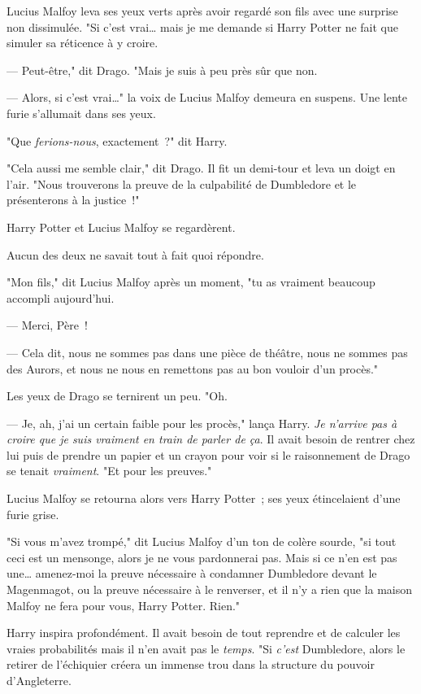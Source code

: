 Lucius Malfoy leva ses yeux verts après avoir regardé son fils avec une surprise non dissimulée. "Si c'est vrai… mais je me demande si Harry Potter ne fait que simuler sa réticence à y croire.

--- Peut-être," dit Drago. "Mais je suis à peu près sûr que non.

--- Alors, si c'est vrai…" la voix de Lucius Malfoy demeura en suspens. Une lente furie s'allumait dans ses yeux.

"Que \emph{ferions-nous}, exactement~?" dit Harry.

"Cela aussi me semble clair," dit Drago. Il fit un demi-tour et leva un doigt en l'air. "Nous trouverons la preuve de la culpabilité de Dumbledore et le présenterons à la justice~!"

Harry Potter et Lucius Malfoy se regardèrent.

Aucun des deux ne savait tout à fait quoi répondre.

"Mon fils," dit Lucius Malfoy après un moment, "tu as vraiment beaucoup accompli aujourd'hui.

--- Merci, Père~!

--- Cela dit, nous ne sommes pas dans une pièce de théâtre, nous ne sommes pas des Aurors, et nous ne nous en remettons pas au bon vouloir d'un procès."

Les yeux de Drago se ternirent un peu. "Oh.

--- Je, ah, j'ai un certain faible pour les procès," lança Harry. \emph{Je n'arrive pas à croire que je suis vraiment en train de parler de ça}. Il avait besoin de rentrer chez lui puis de prendre un papier et un crayon pour voir si le raisonnement de Drago se tenait \emph{vraiment}. "Et pour les preuves."

Lucius Malfoy se retourna alors vers Harry Potter~; ses yeux étincelaient d'une furie grise.

"Si vous m'avez trompé," dit Lucius Malfoy d'un ton de colère sourde, "si tout ceci est un mensonge, alors je ne vous pardonnerai pas. Mais si ce n'en est pas une… amenez-moi la preuve nécessaire à condamner Dumbledore devant le Magenmagot, ou la preuve nécessaire à le renverser, et il n'y a rien que la maison Malfoy ne fera pour vous, Harry Potter. Rien."

Harry inspira profondément. Il avait besoin de tout reprendre et de calculer les vraies probabilités mais il n'en avait pas le \emph{temps}. "Si \emph{c'est} Dumbledore, alors le retirer de l'échiquier créera un immense trou dans la structure du pouvoir d'Angleterre.


